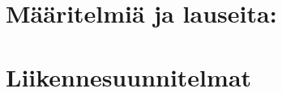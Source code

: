 


\chapter{Määritelmiä ja lauseita:} %
 

\chapter{Liikennesuunnitelmat}





\appendix

%
%
%
%
%
%

